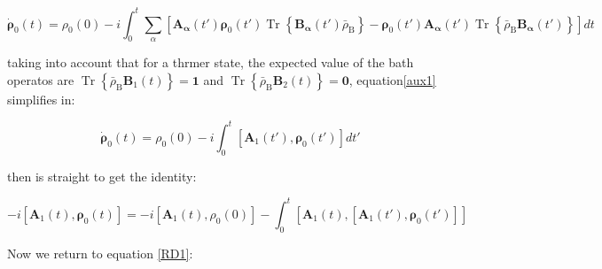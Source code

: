 \documentclass[%
preprint,
onecolumn,
notitlepag,
 amsmath,amssymb,
 aps,
 pra,
]{revtex4-2}
\begin{document}
\begin{itemize}
\begin{equation}
    \dot{\boldsymbol{\rho}}_0(t)= \rho_0(0) - i \int_0 ^t  \sum_{\alpha}\left[\boldsymbol{A}_{\boldsymbol{\alpha}}(t') \boldsymbol{\rho}_0(t') \operatorname{Tr}\left\{\boldsymbol{B}_{\boldsymbol{\alpha}}(t') \bar{\rho}_{\mathrm{B}}\right\}-\boldsymbol{\rho}_0(t') \boldsymbol{A}_{\boldsymbol{\alpha}}(t') \operatorname{Tr}\left\{\bar{\rho}_{\mathrm{B}} \boldsymbol{B}_{\boldsymbol{\alpha}}(t')\right\}\right] dt
    \label{aux1}
\end{equation}


taking into account that for a thrmer state, the expected value of the bath operatos are $ \operatorname{Tr}\left\{\bar{\rho}_{\mathrm{B}} \boldsymbol{B}_1(t)\right\}  = \mathbf{1} $ and $\operatorname{Tr}\left\{\bar{\rho}_{\mathrm{B}} \boldsymbol{B}_2 (t)\right\}= \mathbf{0} $, equation\eqref{aux1}  simplifies in:

\begin{equation}
     \dot{\boldsymbol{\rho}}_0(t)=  \rho_0(0) - i \int_0^t \left[\boldsymbol{A}_1(t') ,  \boldsymbol{\rho}_0(t')  \right] dt'
\end{equation}

then is straight  to get the identity:


\begin{equation}
  -i \left[ \boldsymbol{A}_1(t), \boldsymbol{\rho}_0(t)  \right]  = -i \left[ \boldsymbol{A}_1(t), \rho_0(0)  \right] - \int_0^t \left[  \boldsymbol{A}_1(t), \left[ \boldsymbol{A}_1(t') , \boldsymbol{\rho}_0(t')   \right]        \right]
    \label{identity1}
\end{equation}




Now we return to equation \eqref{RD1}: 


\end{itemize}
\end{document}
